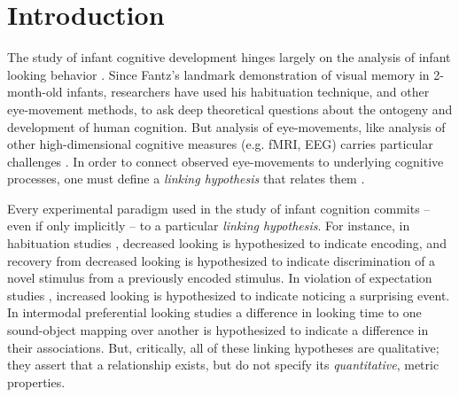 \documentclass[12pt]{article}
\begin{document}
\section*{Introduction}

The study of infant cognitive development hinges largely on the analysis of infant looking behavior \cite{Aslin2007}. Since Fantz’s \cite{Fantz1964} landmark demonstration of visual memory in 2-month-old infants, researchers have used his habituation technique, and other eye-movement methods, to ask deep theoretical questions about the ontogeny and development of human cognition. But analysis of eye-movements, like analysis of other high-dimensional cognitive measures (e.g. fMRI, EEG) carries particular challenges \cite{Yu2012}. In order to connect observed eye-movements to underlying cognitive processes, one must define a \emph{linking hypothesis} that relates them \cite{Aslin2007, Teller1984}. 
	
	Every experimental paradigm used in the study of infant cognition commits -- even if only implicitly -- to a particular \emph{linking hypothesis}. For instance, in habituation studies \cite{Fantz1964, Stager1997}, decreased looking is hypothesized to indicate encoding, and recovery from decreased looking is hypothesized to indicate discrimination of a novel stimulus from a previously encoded stimulus. In violation of expectation studies \cite{Baillargeon1986, Kobayashi2005}, increased looking is hypothesized to indicate noticing a surprising event. In intermodal preferential looking studies \cite{Golinkoff1987, Smith2008} a difference in looking time to one sound-object mapping over another is hypothesized to indicate a difference in their associations. But, critically, all of these linking hypotheses are qualitative; they assert that a relationship exists, but do not specify its \emph{quantitative}, metric properties.
	
\end{document}
